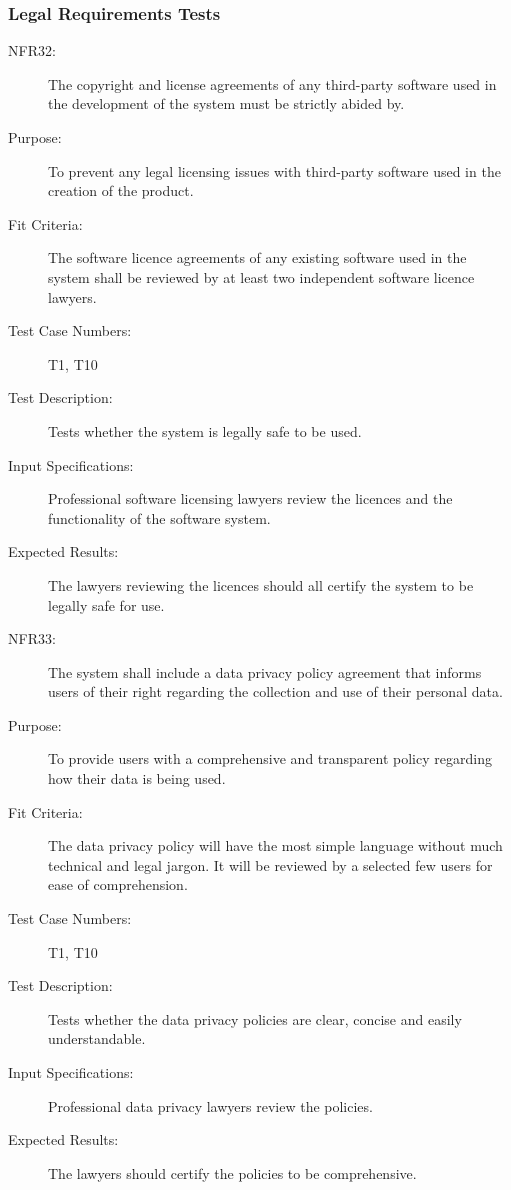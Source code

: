\documentclass[a4paper,twoside,phd]{BYUPhys}
\begin{document}
\subsubsection{Legal Requirements Tests}
\begin{description}
\item[NFR32:] The copyright and license agreements of any third-party software used in the development of the system must be strictly abided by.
\item[Purpose:] To prevent any legal licensing issues with third-party software used in the creation of the product.
\item[Fit Criteria:] The software licence agreements of any existing software used in the system shall be reviewed by at least two independent software licence lawyers.
\item[Test Case Numbers:] T1, T10
\item[Test Description:] Tests whether the system is legally safe to be used.
\item[Input Specifications:] Professional software licensing lawyers review the licences and the functionality of the software system.
\item[Expected Results:] The lawyers reviewing the licences should all certify the system to be legally safe for use.

\item[NFR33:] The system shall include a data privacy policy agreement that informs users of their right regarding the collection and use of their personal data.
\item[Purpose:] To provide users with a comprehensive and transparent policy regarding how their data is being used.
\item[Fit Criteria:] The data privacy policy will have the most simple language without much technical and legal jargon. It will be reviewed by a selected few users for ease of comprehension.
\item[Test Case Numbers:] T1, T10
\item[Test Description:] Tests whether the data privacy policies are clear, concise and easily understandable.
\item[Input Specifications:] Professional data privacy lawyers review the policies.
\item[Expected Results:] The lawyers should certify the policies to be comprehensive.


\end{description}
\end{document}
